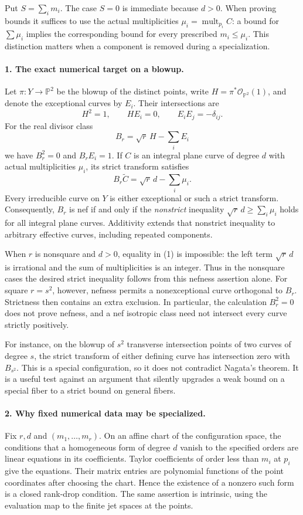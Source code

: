 \documentclass[11pt]{article}
\begin{document}
Put $S=\sum_i m_i$. The case $S=0$ is immediate because $d>0$. When proving bounds it suffices to use the actual multiplicities $\mu_i=\operatorname{mult}_{p_i}C$: a bound for $\sum\mu_i$ implies the corresponding bound for every prescribed $m_i\le\mu_i$. This distinction matters when a component is removed during a specialization.

\paragraph{1. The exact numerical target on a blowup.}
Let $\pi:Y\to\mathbb P^2$ be the blowup of the distinct points, write $H=\pi^*\mathcal O_{\mathbb P^2}(1)$, and denote the exceptional curves by $E_i$. Their intersections are
\[
 H^2=1,\qquad H E_i=0,\qquad E_iE_j=-\delta_{ij}.
\]
For the real divisor class
\[
 B_r=\sqrt r\,H-\sum_iE_i
\]
we have $B_r^2=0$ and $B_rE_i=1$. If $C$ is an integral plane curve of degree $d$ with actual multiplicities $\mu_i$, its strict transform satisfies
\[
 B_r\widetilde C=\sqrt r\,d-\sum_i\mu_i.                 \tag{1}
\]
Every irreducible curve on $Y$ is either exceptional or such a strict transform. Consequently, $B_r$ is nef if and only if the \emph{nonstrict} inequality $\sqrt r\,d\ge\sum_i\mu_i$ holds for all integral plane curves. Additivity extends that nonstrict inequality to arbitrary effective curves, including repeated components.

When $r$ is nonsquare and $d>0$, equality in (1) is impossible: the left term $\sqrt r\,d$ is irrational and the sum of multiplicities is an integer. Thus in the nonsquare cases the desired strict inequality follows from this nefness assertion alone. For square $r=s^2$, however, nefness permits a nonexceptional curve orthogonal to $B_r$. Strictness then contains an extra exclusion. In particular, the calculation $B_r^2=0$ does not prove nefness, and a nef isotropic class need not intersect every curve strictly positively.

For instance, on the blowup of $s^2$ transverse intersection points of two curves of degree $s$, the strict transform of either defining curve has intersection zero with $B_{s^2}$. This is a special configuration, so it does not contradict Nagata's theorem. It is a useful test against an argument that silently upgrades a weak bound on a special fiber to a strict bound on general fibers.

\paragraph{2. Why fixed numerical data may be specialized.}
Fix $r,d$ and $(m_1,\ldots,m_r)$. On an affine chart of the configuration space, the conditions that a homogeneous form of degree $d$ vanish to the specified orders are linear equations in its coefficients. Taylor coefficients of order less than $m_i$ at $p_i$ give the equations. Their matrix entries are polynomial functions of the point coordinates after choosing the chart. Hence the existence of a nonzero such form is a closed rank-drop condition. The same assertion is intrinsic, using the evaluation map to the finite jet spaces at the points.
\end{document}
